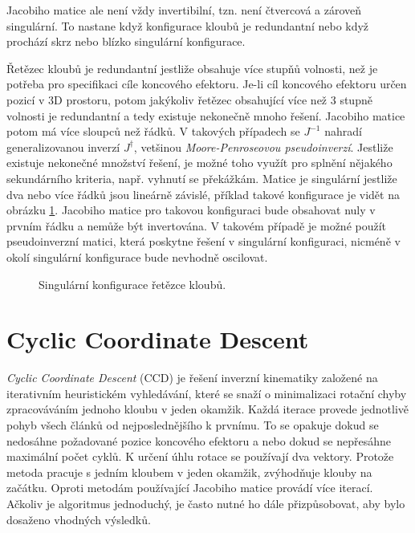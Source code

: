Jacobiho matice ale není vždy invertibilní, tzn. není čtvercová a zároveň singulární. To nastane když konfigurace kloubů je redundantní nebo když prochází skrz nebo blízko singulární konfigurace.

Řetězec kloubů je redundantní jestliže obsahuje více stupňů volnosti, než je potřeba pro specifikaci cíle koncového efektoru. Je-li cíl koncového efektoru určen pozicí v 3D prostoru, potom jakýkoliv řetězec obsahující více než 3 stupně volnosti je redundantní a tedy existuje nekonečně mnoho řešení. Jacobiho matice potom má více sloupců než řádků. V takových případech se $J^{-1}$ nahradí generalizovanou inverzí $J^{\dagger}$, vetšinou \textit{Moore-Penroseovou pseudoinverzí}. Jestliže existuje nekonečné množství řešení, je možné toho využít pro splnění nějakého sekundárního kriteria, např. vyhnutí se překážkám.
Matice je singulární jestliže dva nebo více řádků jsou lineárně závislé, příklad takové konfigurace je vidět na obrázku \ref{singular}. Jacobiho matice pro takovou konfiguraci bude obsahovat nuly v prvním řádku a nemůže být invertována. V takovém případě je možné použít pseudoinverzní matici, která poskytne řešení v singulární konfiguraci, nicméně v okolí singulární konfigurace bude nevhodně oscilovat. 
\begin{figure}[h]
\begin{center}
\caption{Singulární konfigurace řetězce kloubů.} \label{singular}
\end{center}
\end{figure}
\section{Cyclic Coordinate Descent} \label{ccd}
\textit{Cyclic Coordinate Descent} (CCD) \cite{welman} je řešení inverzní kinematiky založené na iterativním heuristickém vyhledávání, které se snaží o minimalizaci rotační chyby  zpracováváním jednoho kloubu v jeden okamžik. Každá iterace provede jednotlivě pohyb všech článků od nejposlednějšího k prvnímu. To se opakuje dokud se nedosáhne požadované pozice koncového efektoru a nebo dokud se nepřesáhne maximální počet cyklů. K určení úhlu rotace se používají dva vektory. Protože metoda pracuje s jedním kloubem v jeden okamžik, zvýhodňuje klouby na začátku. Oproti metodám používající Jacobiho matice provádí více iterací. Ačkoliv je algoritmus jednoduchý, je často nutné ho dále přizpůsobovat, aby bylo dosaženo vhodných výsledků.

